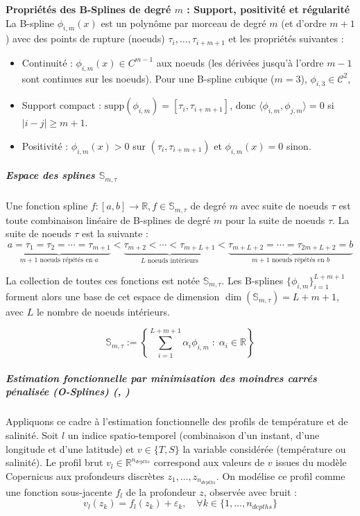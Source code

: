 \documentclass{article}
\begin{document}
	\textbf{Propriétés des B-Splines de degré $m$ : Support, positivité et régularité}
	La B-spline $\phi_{i, m}(x)$ est un polynôme par morceau de degré $m$ (et d'ordre $m+1$) avec des points de rupture (noeuds) $\tau_i, \ldots, \tau_{i+m+1}$ et les propriétés suivantes :
	\begin{itemize}
		\item Continuité : $\phi_{i, m}(x) \in C^{m-1}$ aux noeuds (les dérivées jusqu'à l'ordre $m-1$ sont continues sur les noeuds). Pour une B-spline cubique ($m=3$), $\phi_{i, 3} \in \mathcal{C}^{2}$,
		\item Support compact : $\text{supp}(\phi_{i,m}) = [\tau_i, \tau_{i+m+1}]$, 
		donc $\langle \phi_{i,m}, \phi_{j,m} \rangle = 0$ si $|i-j| \geq m+1$.
		\item Positivité : $\phi_{i,m}(x) > 0$ sur $(\tau_i, \tau_{i+m+1})$ 
		et $\phi_{i,m}(x) = 0$ sinon.
	\end{itemize}
	
	
	\subparagraph{Espace des splines $\mathbb{S}_{m, \tau}$}
	Une fonction spline $f : [a, b] \rightarrow \mathbb{R}, f\in \mathbb{S}_{m, \tau}$ de degré $m$ avec suite de noeuds $\tau$ est toute combinaison linéaire de B-splines de degré $m$ pour la suite de noeuds $\tau$. 
	La suite de noeuds $\tau$ est la suivante : 
	\begin{equation}
		\underbrace{a = \tau_1 = \tau_2 = \cdots = \tau_{m+1}}_{m+1 \text{ noeuds répétés en } a} 
		< 
		\underbrace{\tau_{m+2} < \cdots < \tau_{m+L+1}}_{L \text{ noeuds intérieurs}} 
		< 
		\underbrace{\tau_{m+L+2} = \cdots = \tau_{2m+L+2}=b}_{m+1 \text{ noeuds répétés en } b}
	\end{equation}
	
	La collection de toutes ces fonctions est notée $\mathbb{S}_{m,\tau}$. Les B-splines $\{\phi_{i,m}\}_{i=1}^{L+m+1}$ forment alors une base de cet espace de dimension $\dim(\mathbb{S}_{m,\tau}) = L + m + 1$, avec $L$ le nombre de noeuds intérieurs. 
	
	\begin{equation}
		\mathbb{S}_{m,\tau} := \left\{ \sum_{i=1}^{L+m+1} \alpha_i \phi_{i,m} \;:\; \alpha_i \in \mathbb{R}\right\}
	\end{equation}
	
		\subparagraph{Estimation fonctionnelle par minimisation des moindres carrés 
		pénalisée (O-Splines) (\cite{wand2008}, \cite{eilers1996})}
	\label{par:moindres_carres}
	
	Appliquons ce cadre à l'estimation fonctionnelle des profils de température et de salinité. Soit $l$ un indice spatio-temporel (combinaison d'un instant, d'une longitude et d'une latitude) et $v \in \{T, S\}$ la variable considérée (température ou salinité). Le profil brut $v_l \in \mathbb{R}^{n_{depths}}$ correspond aux valeurs de $v$ issues du modèle Copernicus aux profondeurs discrètes $z_1, \ldots, z_{n_{depths}}$. On modélise ce profil comme une fonction sous-jacente $f_l$ de la profondeur $z$, observée avec bruit :
	\begin{equation}
		v_l(z_k) = f_l(z_k) + \varepsilon_k, \quad \forall k \in \{1, \ldots, n_{depths}\}
	\end{equation}
	
\end{document}
